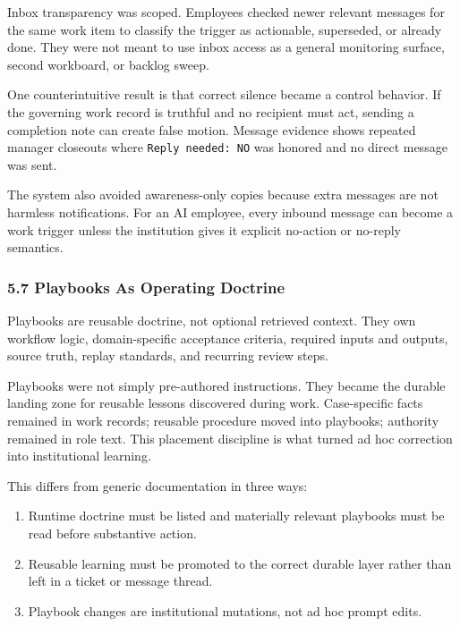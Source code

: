 \documentclass[
]{article}
\providecommand{\tightlist}{%
  \setlength{\itemsep}{0pt}\setlength{\parskip}{0pt}}
\begin{document}
Inbox transparency was scoped. Employees checked newer relevant messages for the same work item to classify the trigger as actionable, superseded, or already done. They were not meant to use inbox access as a general monitoring surface, second workboard, or backlog sweep.

One counterintuitive result is that correct silence became a control behavior. If the governing work record is truthful and no recipient must act, sending a completion note can create false motion. Message evidence shows repeated manager closeouts where \texttt{Reply\ needed:\ NO} was honored and no direct message was sent.

The system also avoided awareness-only copies because extra messages are not harmless notifications. For an AI employee, every inbound message can become a work trigger unless the institution gives it explicit no-action or no-reply semantics.

\subsubsection{5.7 Playbooks As Operating Doctrine}\label{playbooks-as-operating-doctrine}

Playbooks are reusable doctrine, not optional retrieved context. They own workflow logic, domain-specific acceptance criteria, required inputs and outputs, source truth, replay standards, and recurring review steps.

Playbooks were not simply pre-authored instructions. They became the durable landing zone for reusable lessons discovered during work. Case-specific facts remained in work records; reusable procedure moved into playbooks; authority remained in role text. This placement discipline is what turned ad hoc correction into institutional learning.

This differs from generic documentation in three ways:

\begin{enumerate}
\def\labelenumi{\arabic{enumi}.}
\tightlist
\item
  Runtime doctrine must be listed and materially relevant playbooks must be read before substantive action.
\item
  Reusable learning must be promoted to the correct durable layer rather than left in a ticket or message thread.
\item
  Playbook changes are institutional mutations, not ad hoc prompt edits.
\end{enumerate}
\end{document}
